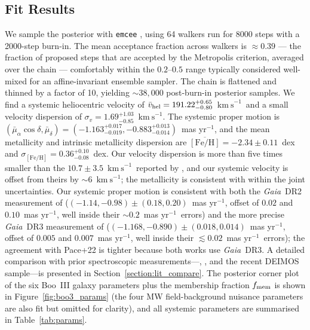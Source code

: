\documentclass[twocolumn, apj, numberedappendix, appendixfloats]{openjournal_dhayaa}
\newcommand{\gaia}{\textit{Gaia}\xspace}
\newcommand{\vlosUnits}{$\mathrm{km~s}^{-1}$\xspace}
\newcommand{\pmUnits}{mas yr$^{-1}$\xspace}
\begin{document}
\subsection{Fit Results}
We sample the posterior with \texttt{emcee} \citep{emcee}, using 64 walkers run for 8000 steps with a 2000-step burn-in. The mean acceptance fraction across walkers is $\approx 0.39$ --- the fraction of proposed steps that are accepted by the Metropolis criterion, averaged over the chain --- comfortably within the $0.2$--$0.5$ range typically considered well-mixed for an affine-invariant ensemble sampler. The chain is flattened and thinned by a factor of 10, yielding $\sim 38{,}000$ post-burn-in posterior samples.
We find a systemic heliocentric velocity of $\bar v_{\rm hel} = 191.22^{+0.65}_{-0.80}$~\vlosUnits\ and a small velocity dispersion of $\sigma_v = 1.69^{+1.03}_{-0.85}$~\vlosUnits.
The systemic proper motion is $(\bar\mu_\alpha\cos\delta, \bar\mu_\delta) = (-1.163^{+0.017}_{-0.019}, -0.883^{+0.013}_{-0.014})$~\pmUnits, and the mean metallicity and intrinsic metallicity dispersion are $\overline{[\mathrm{Fe/H}]} = -2.34 \pm 0.11$~dex and $\sigma_{[\mathrm{Fe/H}]} = 0.36^{+0.10}_{-0.08}$~dex.
Our velocity dispersion is more than five times smaller than the $10.7 \pm 3.5$~\vlosUnits\ reported by \citet{Carlin2018}, and our systemic velocity is offset from theirs by $\sim 6$~\vlosUnits; the metallicity is consistent with \citet{Carlin2018} within the joint uncertainties.  Our systemic proper motion is consistent with both the \gaia~DR2 measurement of \citet{Carlin2018} ($(-1.14, -0.98) \pm (0.18, 0.20)$~\pmUnits, offset of $0.02$ and $0.10$~\pmUnits, well inside their $\sim 0.2$~\pmUnits\ errors) and the more precise \gaia~DR3 measurement of \citet{Pace2022} ($(-1.168, -0.890) \pm (0.018, 0.014)$~\pmUnits, offset of $0.005$ and $0.007$~\pmUnits, well inside their $\lesssim 0.02$~\pmUnits\ errors); the agreement with Pace+22 is tighter because both works use \gaia\ DR3. A detailed comparison with prior spectroscopic measurements---\citet{Carlin2009}, \citet{Carlin2018}, and the recent \citet{Geha2026} DEIMOS sample---is presented in Section~\ref{section:lit_compare}.
The posterior corner plot of the six Boo~III galaxy parameters plus the membership fraction $f_{\rm mem}$ is shown in Figure~\ref{fig:boo3_params} (the four MW field-background nuisance parameters are also fit but omitted for clarity), and all systemic parameters are summarised in Table~\ref{tab:params}.
\end{document}
